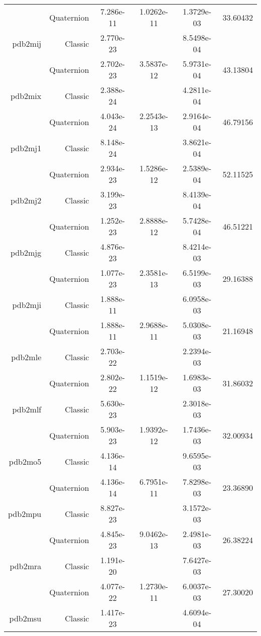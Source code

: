 \begin{xltabular}{\textwidth}{r|rS[table-format=1.3e+2]S[table-format=1.4e+2]S[table-format=1.4e+2]S[table-format=-1.5]}
& Quaternion & 7.286e-11 & 1.0262e-11 & 1.3729e-03 & 33.60432\\  \addlinespace
pdb2mij & Classic & 2.770e-23 &  & 8.5498e-04 & \\
& Quaternion & 2.702e-23 & 3.5837e-12 & 5.9731e-04 & 43.13804\\  \addlinespace
pdb2mix & Classic & 2.388e-24 &  & 4.2811e-04 & \\
& Quaternion & 4.043e-24 & 2.2543e-13 & 2.9164e-04 & 46.79156\\  \addlinespace
pdb2mj1 & Classic & 8.148e-24 &  & 3.8621e-04 & \\
& Quaternion & 2.934e-23 & 1.5286e-12 & 2.5389e-04 & 52.11525\\  \addlinespace
pdb2mj2 & Classic & 3.199e-23 &  & 8.4139e-04 & \\
& Quaternion & 1.252e-23 & 2.8888e-12 & 5.7428e-04 & 46.51221\\  \addlinespace
pdb2mjg & Classic & 4.876e-23 &  & 8.4214e-03 & \\
& Quaternion & 1.077e-23 & 2.3581e-13 & 6.5199e-03 & 29.16388\\  \addlinespace
pdb2mji & Classic & 1.888e-11 &  & 6.0958e-03 & \\
& Quaternion & 1.888e-11 & 2.9688e-11 & 5.0308e-03 & 21.16948\\  \addlinespace
pdb2mle & Classic & 2.703e-22 &  & 2.2394e-03 & \\
& Quaternion & 2.802e-22 & 1.1519e-12 & 1.6983e-03 & 31.86032\\  \addlinespace
pdb2mlf & Classic & 5.630e-23 &  & 2.3018e-03 & \\
& Quaternion & 5.903e-23 & 1.9392e-12 & 1.7436e-03 & 32.00934\\  \addlinespace
pdb2mo5 & Classic & 4.136e-14 &  & 9.6595e-03 & \\
& Quaternion & 4.136e-14 & 6.7951e-11 & 7.8298e-03 & 23.36890\\  \addlinespace
pdb2mpu & Classic & 8.827e-23 &  & 3.1572e-03 & \\
& Quaternion & 4.845e-23 & 9.0462e-13 & 2.4981e-03 & 26.38224\\  \addlinespace
pdb2mra & Classic & 1.191e-20 &  & 7.6427e-03 & \\
& Quaternion & 4.077e-22 & 1.2730e-11 & 6.0037e-03 & 27.30020\\  \addlinespace
pdb2msu & Classic & 1.417e-23 &  & 4.6094e-04 & \\

\end{xltabular}
